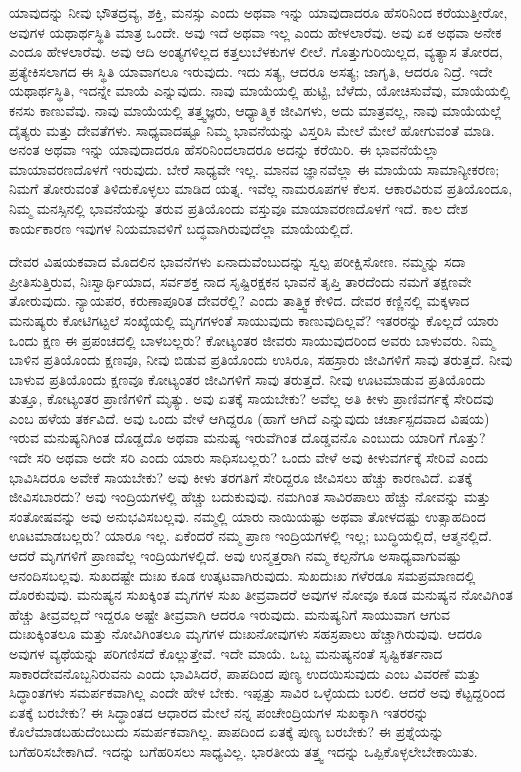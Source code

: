 ಯಾವುದನ್ನು ನೀವು ಭೌತದ್ರವ್ಯ, ಶಕ್ತಿ, ಮನಸ್ಸು ಎಂದು ಅಥವಾ ಇನ್ನು ಯಾವುದಾದರೂ ಹೆಸರಿನಿಂದ ಕರೆಯುತ್ತೀರೋ, ಅವುಗಳ ಯಥಾರ್ಥಸ್ಥಿತಿ ಮಾತ್ರ ಒಂದೇ. ಅವು ಇದೆ ಅಥವಾ ಇಲ್ಲ ಎಂದು ಹೇಳಲಾರೆವು. ಅವು ಏಕ ಅಥವಾ ಅನೇಕ ಎಂದೂ ಹೇಳಲಾರೆವು. ಅವು ಆದಿ ಅಂತ್ಯಗಳಿಲ್ಲದ ಕತ್ತಲುಬೆಳಕುಗಳ ಲೀಲೆ. ಗೊತ್ತುಗುರಿಯಿಲ್ಲದ, ವ್ಯತ್ಯಾಸ ತೋರದ, ಪ್ರತ್ಯೇಕಿಸಲಾಗದ ಈ ಸ್ಥಿತಿ ಯಾವಾಗಲೂ ಇರುವುದು. ಇದು ಸತ್ಯ, ಆದರೂ ಅಸತ್ಯ; ಜಾಗೃತಿ, ಆದರೂ ನಿದ್ರೆ. ಇದೇ ಯಥಾರ್ಥಸ್ಥಿತಿ, ಇದನ್ನೇ ಮಾಯೆ ಎನ್ನುವುದು. ನಾವು ಮಾಯೆಯಲ್ಲಿ ಹುಟ್ಟಿ, ಬೆಳೆದು, ಯೋಚಿಸುವೆವು, ಮಾಯೆಯಲ್ಲಿ ಕನಸು ಕಾಣುವೆವು. ನಾವು ಮಾಯೆಯಲ್ಲಿ ತತ್ತ್ವಜ್ಞರು, ಆಧ್ಯಾತ್ಮಿಕ ಜೀವಿಗಳು, ಅದು ಮಾತ್ರವಲ್ಲ, ನಾವು ಮಾಯೆಯಲ್ಲೆ ದೈತ್ಯರು ಮತ್ತು ದೇವತೆಗಳು. ಸಾಧ್ಯವಾದಷ್ಟೂ ನಿಮ್ಮ ಭಾವನೆಯನ್ನು ವಿಸ್ತರಿಸಿ ಮೇಲೆ ಮೇಲೆ ಹೋಗುವಂತೆ ಮಾಡಿ. ಅನಂತ ಅಥವಾ ಇನ್ನು ಯಾವುದಾದರೂ ಹೆಸರಿನಿಂದಲಾದರೂ ಅದನ್ನು ಕರೆಯಿರಿ. ಈ ಭಾವನೆಯೆಲ್ಲಾ ಮಾಯಾವರಣದೊಳಗೆ ಇರುವುದು. ಬೇರೆ ಸಾಧ್ಯವೇ ಇಲ್ಲ. ಮಾನವ ಜ್ಞಾನವೆಲ್ಲಾ ಈ ಮಾಯೆಯ ಸಾಮಾನ್ಯೀಕರಣ; ನಿಮಗೆ ತೋರುವಂತೆ ತಿಳಿದುಕೊಳ್ಳಲು ಮಾಡಿದ ಯತ್ನ. ಇವೆಲ್ಲ ನಾಮರೂಪಗಳ ಕೆಲಸ. ಆಕಾರವಿರುವ ಪ್ರತಿಯೊಂದೂ, ನಿಮ್ಮ ಮನಸ್ಸಿನಲ್ಲಿ ಭಾವನೆಯನ್ನು ತರುವ ಪ್ರತಿಯೊಂದು ವಸ್ತುವೂ ಮಾಯಾವರಣದೊಳಗೆ ಇದೆ. ಕಾಲ ದೇಶ ಕಾರ್ಯಕಾರಣ ಇವುಗಳ ನಿಯಮಾವಳಿಗೆ ಬದ್ಧವಾಗಿರುವುದೆಲ್ಲಾ ಮಾಯೆಯಲ್ಲಿದೆ.

ದೇವರ ವಿಷಯಕವಾದ ಮೊದಲಿನ ಭಾವನೆಗಳು ಏನಾದುವೆಂಬುದನ್ನು ಸ್ವಲ್ಪ ಪರೀಕ್ಷಿಸೋಣ. ನಮ್ಮನ್ನು ಸದಾ ಪ್ರೀತಿಸುತ್ತಿರುವ, ನಿಃಸ್ವಾರ್ಥಿಯಾದ, ಸರ್ವಶಕ್ತ ನಾದ ಸೃಷ್ಟಿರಕ್ಷಕನ ಭಾವನೆ ತೃಪ್ತಿ ತಾರದೆಂದು ನಮಗೆ ತಕ್ಷಣವೇ ತೋರುವುದು. ನ್ಯಾಯಪರ, ಕರುಣಾಪೂರಿತ ದೇವರೆಲ್ಲಿ? ಎಂದು ತಾತ್ತ್ವಿಕ ಕೇಳಿದ. ದೇವರ ಕಣ್ಣಿನಲ್ಲಿ ಮಕ್ಕಳಾದ ಮನುಷ್ಯರು ಕೋಟಿಗಟ್ಟಲೆ ಸಂಖ್ಯೆಯಲ್ಲಿ ಮೃಗಗಳಂತೆ ಸಾಯುವುದು ಕಾಣುವುದಿಲ್ಲವೆ? ಇತರರನ್ನು ಕೊಲ್ಲದೆ ಯಾರು ಒಂದು ಕ್ಷಣ ಈ ಪ್ರಪಂಚದಲ್ಲಿ ಬಾಳಬಲ್ಲರು? ಕೋಟ್ಯಂತರ ಜೀವರು ಸಾಯುವುದರಿಂದ ಅವರು ಬಾಳುವರು. ನಿಮ್ಮ ಬಾಳಿನ ಪ್ರತಿಯೊಂದು ಕ್ಷಣವೂ, ನೀವು ಬಿಡುವ ಪ್ರತಿಯೊಂದು ಉಸಿರೂ, ಸಹಸ್ರಾರು ಜೀವಿಗಳಿಗೆ ಸಾವು ತರುತ್ತದೆ. ನೀವು ಬಾಳುವ ಪ್ರತಿಯೊಂದು ಕ್ಷಣವೂ ಕೋಟ್ಯಂತರ ಜೀವಿಗಳಿಗೆ ಸಾವು ತರುತ್ತದೆ. ನೀವು ಊಟಮಾಡುವ ಪ್ರತಿಯೊಂದು ತುತ್ತೂ, ಕೋಟ್ಯಂತರ ಪ್ರಾಣಿಗಳಿಗೆ ಮೃತ್ಯು. ಅವು ಏತಕ್ಕೆ ಸಾಯಬೇಕು? ಅವೆಲ್ಲ ಅತಿ ಕೀಳು ಪ್ರಾಣಿವರ್ಗಕ್ಕೆ ಸೇರಿದವು ಎಂಬ ಹಳೆಯ ತರ್ಕವಿದೆ. ಅವು ಒಂದು ವೇಳೆ ಆಗಿದ್ದರೂ (ಹಾಗೆ ಆಗಿದೆ ಎನ್ನುವುದು ಚರ್ಚಾಸ್ಪದವಾದ ವಿಷಯ) ಇರುವ ಮನುಷ್ಯನಿಗಿಂತ ದೊಡ್ಡದೊ ಅಥವಾ ಮನುಷ್ಯ ಇರುವೆಗಿಂತ ದೊಡ್ಡವನೊ ಎಂಬುದು ಯಾರಿಗೆ ಗೊತ್ತು? ಇದೇ ಸರಿ ಅಥವಾ ಅದೇ ಸರಿ ಎಂದು ಯಾರು ಸಾಧಿಸಬಲ್ಲರು? ಒಂದು ವೇಳೆ ಅವು ಕೀಳುವರ್ಗಕ್ಕೆ ಸೇರಿವೆ ಎಂದು ಭಾವಿಸಿದರೂ ಅವೇಕೆ ಸಾಯಬೇಕು? ಅವು ಕೀಳು ತರಗತಿಗೆ ಸೇರಿದ್ದರೂ ಜೀವಿಸಲು ಹೆಚ್ಚು ಕಾರಣವಿದೆ. ಏತಕ್ಕೆ ಜೀವಿಸಬಾರದು? ಅವು ಇಂದ್ರಿಯಗಳಲ್ಲಿ ಹೆಚ್ಚು ಬದುಕುವುವು. ನಮಗಿಂತ ಸಾವಿರಪಾಲು ಹೆಚ್ಚು ನೋವನ್ನು ಮತ್ತು ಸಂತೋಷವನ್ನು ಅವು ಅನುಭವಿಸಬಲ್ಲವು. ನಮ್ಮಲ್ಲಿ ಯಾರು ನಾಯಿಯಷ್ಟು ಅಥವಾ ತೋಳದಷ್ಟು ಉತ್ಸಾಹದಿಂದ ಊಟಮಾಡಬಲ್ಲರು? ಯಾರೂ ಇಲ್ಲ. ಏಕೆಂದರೆ ನಮ್ಮ ಪ್ರಾಣ ಇಂದ್ರಿಯಗಳಲ್ಲಿ ಇಲ್ಲ; ಬುದ್ಧಿಯಲ್ಲಿದೆ, ಆತ್ಮನಲ್ಲಿದೆ. ಆದರೆ ಮೃಗಗಳಿಗೆ ಪ್ರಾಣವೆಲ್ಲ ಇಂದ್ರಿಯಗಳಲ್ಲಿದೆ. ಅವು ಉನ್ಮತ್ತರಾಗಿ ನಮ್ಮ ಕಲ್ಪನೆಗೂ ಅಸಾಧ್ಯವಾಗುವಷ್ಟು ಆನಂದಿಸಬಲ್ಲವು. ಸುಖದಷ್ಟೇ ದುಃಖ ಕೂಡ ಉತ್ಕಟವಾಗಿರುವುದು. ಸುಖದುಃಖ ಗಳೆರಡೂ ಸಮಪ್ರಮಾಣದಲ್ಲಿ ದೊರಕುವುವು. ಮನುಷ್ಯನ ಸುಖಕ್ಕಿಂತ ಮೃಗಗಳ ಸುಖ ತೀವ್ರವಾದರೆ ಅವುಗಳ ನೋವೂ ಕೂಡ ಮನುಷ್ಯನ ನೋವಿಗಿಂತ ಹೆಚ್ಚು ತೀವ್ರವಲ್ಲದೆ ಇದ್ದರೂ ಅಷ್ಟೇ ತೀವ್ರವಾಗಿ ಆದರೂ ಇರುವುದು. ಮನುಷ್ಯನಿಗೆ ಸಾಯುವಾಗ ಆಗುವ ದುಃಖಕ್ಕಿಂತಲೂ ಮತ್ತು ನೋವಿಗಿಂತಲೂ ಮೃಗಗಳ ದುಃಖನೋವುಗಳು ಸಹಸ್ರಪಾಲು ಹೆಚ್ಚಾಗಿರುವುವು. ಆದರೂ ಅವುಗಳ ವ್ಯಥೆಯನ್ನು ಪರಿಗಣಿಸದೆ ಕೊಲ್ಲುತ್ತೇವೆ. ಇದೇ ಮಾಯೆ. ಒಬ್ಬ ಮನುಷ್ಯನಂತೆ ಸೃಷ್ಟಿಕರ್ತನಾದ ಸಾಕಾರದೇವನೊಬ್ಬನಿರುವನು ಎಂದು ಭಾವಿಸಿದರೆ, ಪಾಪದಿಂದ ಪುಣ್ಯ ಉದಯಿಸುವುದು ಎಂಬ ವಿವರಣೆ ಮತ್ತು ಸಿದ್ಧಾಂತಗಳು ಸಮರ್ಪಕವಾಗಿಲ್ಲ ಎಂದೇ ಹೇಳ ಬೇಕು. ಇಪ್ಪತ್ತು ಸಾವಿರ ಒಳ್ಳೆಯದು ಬರಲಿ. ಆದರೆ ಅವು ಕೆಟ್ಟದ್ದರಿಂದ ಏತಕ್ಕೆ ಬರಬೇಕು? ಈ ಸಿದ್ಧಾಂತದ ಆಧಾರದ ಮೇಲೆ ನನ್ನ ಪಂಚೇಂದ್ರಿಯಗಳ ಸುಖಕ್ಕಾಗಿ ಇತರರನ್ನು ಕೊಲೆಮಾಡಬಹುದೆಂಬುದು ಸಮರ್ಪಕವಾಗಿಲ್ಲ. ಪಾಪದಿಂದ ಏತಕ್ಕೆ ಪುಣ್ಯ ಬರಬೇಕು? ಈ ಪ್ರಶ್ನೆಯನ್ನು ಬಗೆಹರಿಸಬೇಕಾಗಿದೆ. ಇದನ್ನು ಬಗೆಹರಿಸಲು ಸಾಧ್ಯವಿಲ್ಲ. ಭಾರತೀಯ ತತ್ತ್ವ ಇದನ್ನು ಒಪ್ಪಿಕೊಳ್ಳಲೇಬೇಕಾಯಿತು.

